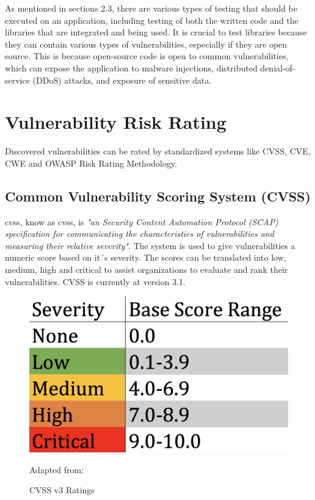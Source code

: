 As mentioned in sections 2.3, there are various types of testing that should be executed on an application, including testing of both the written code and the libraries that are integrated and being used. It is crucial to test libraries because they can contain various types of vulnerabilities, especially if they are open source. This is because open-source code is open to common vulnerabilities, which can expose the application to malware injections, distributed denial-of-service (DDoS) attacks, and exposure of sensitive data. \cite{testlibaries}


\section{Vulnerability Risk Rating}
Discovered vulnerabilities can be rated by standardized systems like CVSS, CVE, CWE and OWASP Risk Rating Methodology. 
\subsection{Common Vulnerability Scoring System (CVSS)}
\acrlong{cvss}, know as \acrshort{cvss}, is \textit{"an Security Content Automation Protocol (SCAP) specification for communicating the characteristics of vulnerabilities and measuring their relative severity"}\cite{nistCVSS}. The system is used to give vulnerabilities a numeric score based on it´s severity. The scores can be translated into low, medium, high and critical to assist organizations to evaluate and rank their vulnerabilities. CVSS is currently at version 3.1. \cite{CVSS}
\begin{figure}[htp]
    \centering
    \includegraphics[scale=0.3]{Images/CVSS.png}
    \caption{CVSS v3 Ratings} Adapted from:\cite{cvssrating}
    \label{fig:my_label}
\end{figure}


